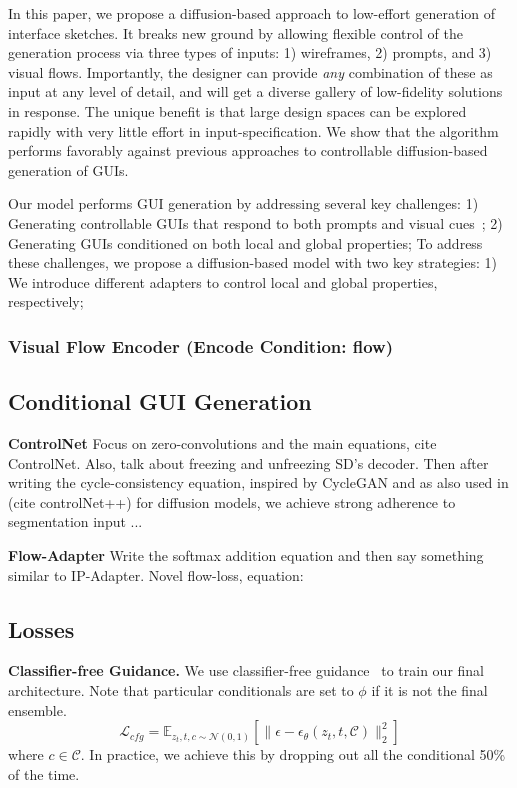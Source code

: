 In this paper, we propose a diffusion-based approach to low-effort generation of interface sketches. It breaks new ground by allowing flexible control of the generation process via three types of inputs: 1) wireframes, 2) prompts, and 3) visual flows. Importantly, the designer can provide \emph{any} combination of these as input at any level of detail, and will get a diverse gallery of low-fidelity solutions in response. The unique benefit is that large design spaces can be explored rapidly with very little effort in input-specification. We show that the algorithm performs favorably against previous approaches to controllable diffusion-based generation of GUIs. 

Our model performs GUI generation by addressing several key challenges:
1) Generating controllable GUIs that respond to both prompts and visual cues~\cite{};
2) Generating GUIs conditioned on both local and global properties;
To address these challenges, we propose a diffusion-based model with two key strategies:
1) We introduce different adapters to control local and global properties, respectively;


\subsubsection{Visual Flow Encoder (Encode Condition: flow)}


\subsection{Conditional GUI Generation}

\noindent \textbf{ControlNet}     
Focus on zero-convolutions and the main equations, cite ControlNet. 
Also, talk about freezing and unfreezing SD's decoder.
Then after writing the cycle-consistency equation, inspired by CycleGAN and as also used in (cite controlNet++) for diffusion models, we achieve strong adherence to segmentation input ...

\noindent \textbf{Flow-Adapter}
Write the softmax addition equation and then say something similar to IP-Adapter.
Novel flow-loss, equation:


\subsection{Losses}

\textbf{Classifier-free Guidance.}
We use classifier-free guidance~\cite{cfg} to train our final architecture. 
Note that particular conditionals are set to $\phi$ if it is not the final ensemble.
\begin{equation}
    \mathcal{L}_{cfg} = \mathbb{E}_{z_t, t, c \sim \mathcal{N}(0,1)} [\| \epsilon - \epsilon_{\theta}(z_t, t, \mathcal{C}) \|^{2}_2]
\end{equation}
where $c \in \mathcal{C}$.
In practice, we achieve this by dropping out all the conditional 50\% of the time.

